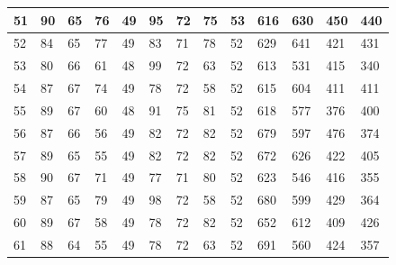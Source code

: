 \documentclass[legalpaper,12pt]{article}
\begin{document}
\begin{table}[h]
\begin{tabular}{|l|l|l|l|l|l|l|l|l|l|l|l|l|}
51                                        & 90         & 65        & 76          & 49         & 95         & 72        & 75          & 53         & 616        & 630       & 450         & 440        \\ \hline
52                                        & 84         & 65        & 77          & 49         & 83         & 71        & 78          & 52         & 629        & 641       & 421         & 431        \\ \hline
53                                        & 80         & 66        & 61          & 48         & 99         & 72        & 63          & 52         & 613        & 531       & 415         & 340        \\ \hline
54                                        & 87         & 67        & 74          & 49         & 78         & 72        & 58          & 52         & 615        & 604       & 411         & 411        \\ \hline
55                                        & 89         & 67        & 60          & 48         & 91         & 75        & 81          & 52         & 618        & 577       & 376         & 400        \\ \hline
56                                        & 87         & 66        & 56          & 49         & 82         & 72        & 82          & 52         & 679        & 597       & 476         & 374        \\ \hline
57                                        & 89         & 65        & 55          & 49         & 82         & 72        & 82          & 52         & 672        & 626       & 422         & 405        \\ \hline
58                                        & 90         & 67        & 71          & 49         & 77         & 71        & 80          & 52         & 623        & 546       & 416         & 355        \\ \hline
59                                        & 87         & 65        & 79          & 49         & 98         & 72        & 58          & 52         & 680        & 599       & 429         & 364        \\ \hline
60                                        & 89         & 67        & 58          & 49         & 78         & 72        & 82          & 52         & 652        & 612       & 409         & 426        \\ \hline
61                                        & 88         & 64        & 55          & 49         & 78         & 72        & 63          & 52         & 691        & 560       & 424         & 357        \\ \hline

\end{tabular}
\end{table}
\end{document}
